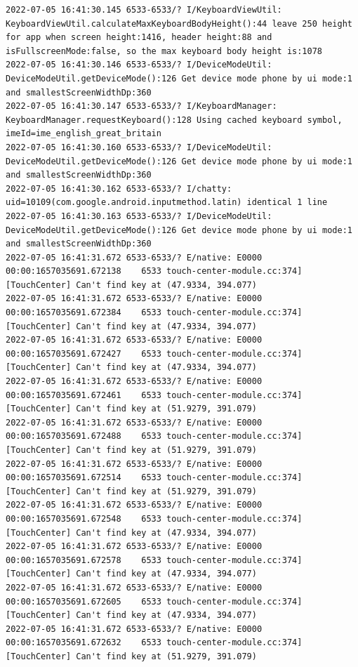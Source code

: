 \documentclass[a4paper,12pt]{book}
\begin{document}
\begin{lstlisting}
2022-07-05 16:41:30.145 6533-6533/? I/KeyboardViewUtil: KeyboardViewUtil.calculateMaxKeyboardBodyHeight():44 leave 250 height for app when screen height:1416, header height:88 and isFullscreenMode:false, so the max keyboard body height is:1078
2022-07-05 16:41:30.146 6533-6533/? I/DeviceModeUtil: DeviceModeUtil.getDeviceMode():126 Get device mode phone by ui mode:1 and smallestScreenWidthDp:360
2022-07-05 16:41:30.147 6533-6533/? I/KeyboardManager: KeyboardManager.requestKeyboard():128 Using cached keyboard symbol, imeId=ime_english_great_britain
2022-07-05 16:41:30.160 6533-6533/? I/DeviceModeUtil: DeviceModeUtil.getDeviceMode():126 Get device mode phone by ui mode:1 and smallestScreenWidthDp:360
2022-07-05 16:41:30.162 6533-6533/? I/chatty: uid=10109(com.google.android.inputmethod.latin) identical 1 line
2022-07-05 16:41:30.163 6533-6533/? I/DeviceModeUtil: DeviceModeUtil.getDeviceMode():126 Get device mode phone by ui mode:1 and smallestScreenWidthDp:360
2022-07-05 16:41:31.672 6533-6533/? E/native: E0000 00:00:1657035691.672138    6533 touch-center-module.cc:374] [TouchCenter] Can't find key at (47.9334, 394.077)
2022-07-05 16:41:31.672 6533-6533/? E/native: E0000 00:00:1657035691.672384    6533 touch-center-module.cc:374] [TouchCenter] Can't find key at (47.9334, 394.077)
2022-07-05 16:41:31.672 6533-6533/? E/native: E0000 00:00:1657035691.672427    6533 touch-center-module.cc:374] [TouchCenter] Can't find key at (47.9334, 394.077)
2022-07-05 16:41:31.672 6533-6533/? E/native: E0000 00:00:1657035691.672461    6533 touch-center-module.cc:374] [TouchCenter] Can't find key at (51.9279, 391.079)
2022-07-05 16:41:31.672 6533-6533/? E/native: E0000 00:00:1657035691.672488    6533 touch-center-module.cc:374] [TouchCenter] Can't find key at (51.9279, 391.079)
2022-07-05 16:41:31.672 6533-6533/? E/native: E0000 00:00:1657035691.672514    6533 touch-center-module.cc:374] [TouchCenter] Can't find key at (51.9279, 391.079)
2022-07-05 16:41:31.672 6533-6533/? E/native: E0000 00:00:1657035691.672548    6533 touch-center-module.cc:374] [TouchCenter] Can't find key at (47.9334, 394.077)
2022-07-05 16:41:31.672 6533-6533/? E/native: E0000 00:00:1657035691.672578    6533 touch-center-module.cc:374] [TouchCenter] Can't find key at (47.9334, 394.077)
2022-07-05 16:41:31.672 6533-6533/? E/native: E0000 00:00:1657035691.672605    6533 touch-center-module.cc:374] [TouchCenter] Can't find key at (47.9334, 394.077)
2022-07-05 16:41:31.672 6533-6533/? E/native: E0000 00:00:1657035691.672632    6533 touch-center-module.cc:374] [TouchCenter] Can't find key at (51.9279, 391.079)

\end{lstlisting}
\end{document}
